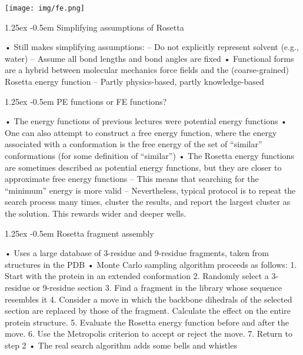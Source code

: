 \documentclass[8pt]{article}
\makeatletter
\newlength{\norm}
\newlength{\nrm}
\renewcommand{\paragraph}{%
  \@startsection{paragraph}{4}%
  {\z@}{1.25ex \@plus 2pt \@minus 2pt}{-0.5em}%
  {\fontsize{\f@size}{\nrm}\normalfont\bfseries}%
}
\makeatother
\begin{document}
\texttt{[image: img/fe.png]}

\paragraph{Simplifying assumptions of Rosetta}

• Still makes simplifying assumptions:
– Do not explicitly represent solvent (e.g., water)
– Assume all bond lengths and bond angles are fixed
• Functional forms are a hybrid between molecular
mechanics force fields and the (coarse-grained) Rosetta
energy function
– Partly physics-based, partly knowledge-based

\paragraph{PE functions or FE functions?}

• The energy functions of previous lectures were potential
energy functions
• One can also attempt to construct a free energy function,
where the energy associated with a conformation is the
free energy of the set of “similar” conformations (for some
definition of “similar”)
• The Rosetta energy functions are sometimes described as
potential energy functions, but they are closer to
approximate free energy functions
– This means that searching for the “minimum” energy is more valid
– Nevertheless, typical protocol is to repeat the search process
many times, cluster the results, and report the largest cluster as
the solution. This rewards wider and deeper wells. 

\paragraph{Rosetta fragment assembly}

• Uses a large database of 3-residue and 9-residue fragments,
taken from structures in the PDB
• Monte Carlo sampling algorithm proceeds as follows:
1. Start with the protein in an extended conformation
2. Randomly select a 3-residue or 9-residue section
3. Find a fragment in the library whose sequence resembles it
4. Consider a move in which the backbone dihedrals of the
selected section are replaced by those of the fragment.
Calculate the effect on the entire protein structure.
5. Evaluate the Rosetta energy function before and after the
move.
6. Use the Metropolis criterion to accept or reject the move.
7. Return to step 2
• The real search algorithm adds some bells and whistles
\end{document}

